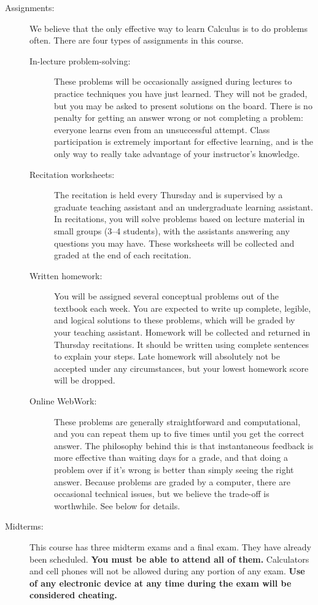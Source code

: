 \documentclass[11pt]{article}
\begin{document}
\begin{description}
\item[Assignments:] We believe that the only effective way to learn
  Calculus is to do problems often. There are four types of
  assignments in this course.
  \begin{description}
  \item[In-lecture problem-solving:] These problems will be
    occasionally assigned during lectures to practice techniques you
    have just learned. They will not be graded, but you may be asked
    to present solutions on the board. There is no penalty for getting
    an answer wrong or not completing a problem: everyone learns even
    from an unsuccessful attempt. Class participation is extremely
    important for effective learning, and is the only way to really
    take advantage of your instructor's knowledge.
  \item[Recitation worksheets:] The recitation is held every Thursday
    and is supervised by a graduate teaching assistant and an
    undergraduate learning assistant. In recitations, you will solve
    problems based on lecture material in small groups (3--4
    students), with the assistants answering any questions you may
    have. These worksheets will be collected and graded at the end of
    each recitation.
  \item[Written homework:] You will be assigned several conceptual
    problems out of the textbook each week. You are expected to write
    up complete, legible, and logical solutions to these problems,
    which will be graded by your teaching assistant. Homework will be
    collected and returned in Thursday recitations. It should be
    written using complete sentences to explain your steps. Late
    homework will absolutely not be accepted under any circumstances,
    but your lowest homework score will be dropped.
  \item[Online WebWork:] These problems are generally straightforward
    and computational, and you can repeat them up to five times until
    you get the correct answer. The philosophy behind this is that
    instantaneous feedback is more effective than waiting days for a
    grade, and that doing a problem over if it's wrong is better than
    simply seeing the right answer. Because problems are graded by a
    computer, there are occasional technical issues, but we believe
    the trade-off is worthwhile. See below for details.
  \end{description}

\item[Midterms:] This course has three midterm exams and a final
  exam. They have already been scheduled. \textbf{You must be able to
    attend all of them.} Calculators and cell phones will not be
  allowed during any portion of any exam. \textbf{Use of any
    electronic device at any time during the exam will be considered
    cheating.}


\end{description}
\end{document}
